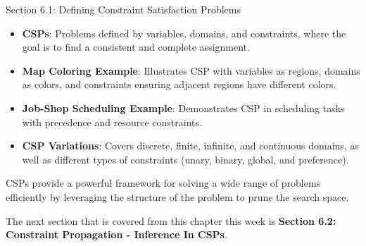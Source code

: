 \begin{notes}{Section 6.1: Defining Constraint Satisfaction Problems}
\begin{highlight}
    \end{highlight}
    
    \begin{highlight}
    
        \begin{itemize}
            \item \textbf{CSPs}: Problems defined by variables, domains, and constraints, where the goal is to find a consistent and complete assignment.
            \item \textbf{Map Coloring Example}: Illustrates CSP with variables as regions, domains as colors, and constraints ensuring adjacent regions have different colors.
            \item \textbf{Job-Shop Scheduling Example}: Demonstrates CSP in scheduling tasks with precedence and resource constraints.
            \item \textbf{CSP Variations}: Covers discrete, finite, infinite, and continuous domains, as well as different types of constraints (unary, binary, global, and preference).
        \end{itemize}
    
        CSPs provide a powerful framework for solving a wide range of problems efficiently by leveraging the structure of the problem to prune the search space.
    
    \end{highlight}
\end{notes}

The next section that is covered from this chapter this week is \textbf{Section 6.2: Constraint Propagation - Inference In CSPs}.

